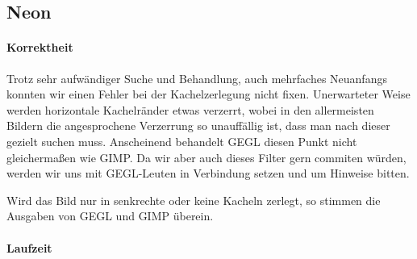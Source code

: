 \subsection{Neon}
\paragraph{Korrektheit}
\label{paragraph:neon_korrektheit}
Trotz sehr aufwändiger Suche und Behandlung, auch mehrfaches Neuanfangs konnten wir einen Fehler bei der Kachelzerlegung nicht fixen.  
Unerwarteter Weise werden horizontale Kachelränder etwas verzerrt, wobei in den allermeisten Bildern die angesprochene Verzerrung so unauffällig ist, dass man nach dieser gezielt suchen muss.
Anscheinend behandelt GEGL diesen Punkt nicht gleichermaßen wie GIMP.
Da wir aber auch dieses Filter gern commiten würden, werden wir uns mit GEGL-Leuten in Verbindung setzen und um Hinweise bitten.

Wird das Bild nur in senkrechte oder keine Kacheln zerlegt, so stimmen die Ausgaben von GEGL und GIMP überein.
\paragraph{Laufzeit}

